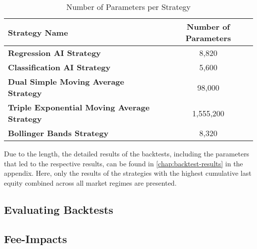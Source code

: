 \begin{table}[H]
    \centering
    \begin{tabular}{L{8cm}c}
        \toprule
        Strategy Name & Number of Parameters
        \\
        \midrule
        \textbf{Regression AI Strategy}                     & 8,820     \\
        \textbf{Classification AI Strategy}                 & 5,600     \\
        \textbf{Dual Simple Moving Average Strategy}        & 98,000    \\
        \textbf{Triple Exponential Moving Average Strategy} & 1,555,200 \\
        \textbf{Bollinger Bands Strategy}                   & 8,320     \\
        \bottomrule
    \end{tabular}
    \caption{Number of Parameters per Strategy}
    \label{tbl:parameters-number}
\end{table}

Due to the length, the detailed results of the backtests, including the parameters that led to the respective results, can be found in \autoref{chap:backtest-results} in the appendix.
Here, only the results of the strategies with the highest cumulative last equity combined across all market regimes are presented.




\subsection{Evaluating Backtests}

\subsection{Fee-Impacts}
